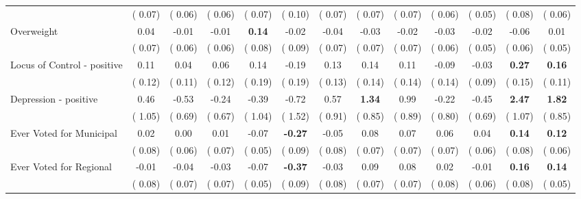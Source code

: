 \begin{tabular}{l c c c c c c c c c c c c}
& (     0.07) & (     0.06) & (     0.06) & (     0.07) & (     0.10) & (     0.07) & (     0.07) & (     0.07) & (     0.06) & (     0.05) & (     0.08) & (     0.06) \\
Overweight &      0.04 &     -0.01 &     -0.01 & \textbf{      0.14 } &     -0.02 &     -0.04 &     -0.03 &     -0.02 &     -0.03 &     -0.02 &     -0.06 &      0.01 \\
& (     0.07) & (     0.06) & (     0.06) & (     0.08) & (     0.09) & (     0.07) & (     0.07) & (     0.07) & (     0.06) & (     0.05) & (     0.06) & (     0.05) \\
Locus of Control - positive &      0.11 &      0.04 &      0.06 &      0.14 &     -0.19 &      0.13 &      0.14 &      0.11 &     -0.09 &     -0.03 & \textbf{     0.27} & \textbf{     0.16} \\
& (     0.12) & (     0.11) & (     0.12) & (     0.19) & (     0.19) & (     0.13) & (     0.14) & (     0.14) & (     0.14) & (     0.09) & (     0.15) & (     0.11) \\
Depression - positive &      0.46 &     -0.53 &     -0.24 &     -0.39 &     -0.72 &      0.57 & \textbf{      1.34 } &      0.99 &     -0.22 &     -0.45 & \textbf{     2.47} & \textbf{     1.82} \\
& (     1.05) & (     0.69) & (     0.67) & (     1.04) & (     1.52) & (     0.91) & (     0.85) & (     0.89) & (     0.80) & (     0.69) & (     1.07) & (     0.85) \\
Ever Voted for Municipal &      0.02 &      0.00 &      0.01 &     -0.07 & \textbf{     -0.27 } &     -0.05 &      0.08 &      0.07 &      0.06 &      0.04 & \textbf{     0.14} & \textbf{     0.12} \\
& (     0.08) & (     0.06) & (     0.07) & (     0.05) & (     0.09) & (     0.08) & (     0.07) & (     0.07) & (     0.07) & (     0.06) & (     0.08) & (     0.06) \\
Ever Voted for Regional &     -0.01 &     -0.04 &     -0.03 &     -0.07 & \textbf{     -0.37 } &     -0.03 &      0.09 &      0.08 &      0.02 &     -0.01 & \textbf{     0.16} & \textbf{     0.14} \\
& (     0.08) & (     0.07) & (     0.07) & (     0.05) & (     0.09) & (     0.08) & (     0.07) & (     0.07) & (     0.08) & (     0.06) & (     0.08) & (     0.05) \\
\bottomrule
\end{tabular}
